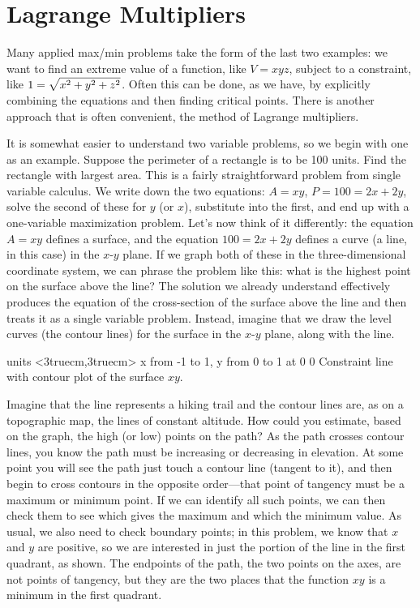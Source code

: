 \section{Lagrange Multipliers}{}{}

Many applied max/min problems take the form of the last two examples:
we want to find an extreme value of a function, like $V=xyz$, subject
to a constraint, like $\displaystyle1=\sqrt{x^2+y^2+z^2}$. Often this can be
done, as we have, by explicitly combining the equations and then
finding critical points. There is another approach that is often
convenient, the method of {\dfont Lagrange multipliers}.

It is somewhat easier to understand two variable problems, so we begin
with one as an example. Suppose the perimeter of a rectangle is to be
100 units. Find the rectangle with largest area. This is a fairly
straightforward problem from single variable calculus. We write down
the two equations: $A=xy$, $P=100=2x+2y$, solve the second of these
for $y$ (or $x$), substitute into the first, and end up with a
one-variable maximization problem. Let's now think of it differently:
the equation $A=xy$ defines a surface, and the equation $100=2x+2y$
defines a curve (a line, in this case) in the $x$-$y$ plane. If we
graph both of these in the three-dimensional coordinate system, we can
phrase the problem like this: what is the highest point on the surface
above the line? The solution we already understand effectively
produces the equation of the cross-section of the surface above the
line and then treats it as a single variable problem. Instead, imagine
that we draw the level curves (the contour lines) for the surface in
the $x$-$y$ plane, along with the line.

\figure
\texonly
\vbox{\beginpicture
\normalgraphs
\ninepoint
\setcoordinatesystem units <3truecm,3truecm>
\setplotarea x from -1 to 1, y from 0 to 1
 at 0 0
\endpicture}
\endtexonly
{}
\begincaption
Constraint line with contour plot of the surface $xy$.
\endcaption
\endfigure

Imagine that the line represents a hiking trail and the contour lines
are, as on a topographic map, the lines of constant altitude. How
could you estimate, based on the graph, the high (or low) points on
the path? As the path crosses contour lines, you know the path must be
increasing or decreasing in elevation. At some point you will see the
path just touch a contour line (tangent to it), and then begin to
cross contours in the opposite order---that point of tangency must be
a maximum or minimum point. If we can identify all such points, we can
then check them to see which gives the maximum and which the minimum
value. As usual, we also need to check boundary points; in this
problem, we know that $x$ and $y$ are positive, so we are interested
in just the portion of the line in the first quadrant, as shown. The
endpoints of the path, the two points on the axes, are not points of
tangency, but they are the two places that the function $xy$ is a
minimum in the first quadrant.

